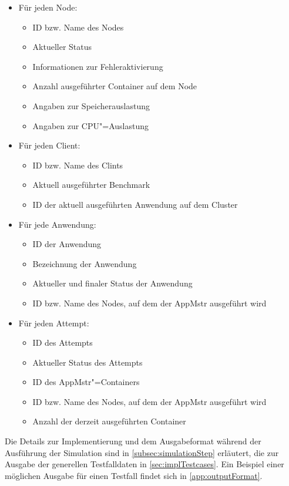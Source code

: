 \begin{itemize}
    \item Für jeden Node:
    \begin{itemize}
        \item ID bzw. Name des Nodes
        \item Aktueller Status
        \item Informationen zur Fehleraktivierung
        \item Anzahl ausgeführter Container auf dem Node
        \item Angaben zur Speicherauslastung
        \item Angaben zur CPU"=Auslastung
    \end{itemize}
    
    \item Für jeden Client:
    \begin{itemize}
        \item ID bzw. Name des Clints
        \item Aktuell ausgeführter Benchmark
        \item ID der aktuell ausgeführten Anwendung auf dem Cluster
    \end{itemize}

    \item Für jede Anwendung:
    \begin{itemize}
        \item ID der Anwendung
        \item Bezeichnung der Anwendung
        \item Aktueller und finaler Status der Anwendung
        \item ID bzw. Name des Nodes, auf dem der \ac{AppMstr} ausgeführt wird
    \end{itemize}

    \item Für jeden Attempt:
    \begin{itemize}
        \item ID des Attempts
        \item Aktueller Status des Attempts
        \item ID des \ac{AppMstr}"=Containers
        \item ID bzw. Name des Nodes, auf dem der \ac{AppMstr} ausgeführt wird
        \item Anzahl der derzeit ausgeführten Container
    \end{itemize}
\end{itemize}

Die Details zur Implementierung und dem Ausgabeformat während der Ausführung der Simulation sind in \cref{subsec:simulationStep} erläutert, die zur Ausgabe der generellen Testfalldaten in \cref{sec:implTestcases}. Ein Beispiel einer möglichen Ausgabe für einen Testfall findet sich in \cref{app:outputFormat}.
